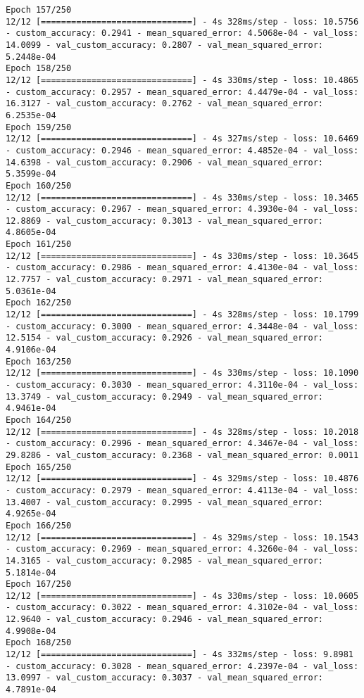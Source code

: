 \begin{lstlisting}
Epoch 157/250
12/12 [==============================] - 4s 328ms/step - loss: 10.5756 - custom_accuracy: 0.2941 - mean_squared_error: 4.5068e-04 - val_loss: 14.0099 - val_custom_accuracy: 0.2807 - val_mean_squared_error: 5.2448e-04
Epoch 158/250
12/12 [==============================] - 4s 330ms/step - loss: 10.4865 - custom_accuracy: 0.2957 - mean_squared_error: 4.4479e-04 - val_loss: 16.3127 - val_custom_accuracy: 0.2762 - val_mean_squared_error: 6.2535e-04
Epoch 159/250
12/12 [==============================] - 4s 327ms/step - loss: 10.6469 - custom_accuracy: 0.2946 - mean_squared_error: 4.4852e-04 - val_loss: 14.6398 - val_custom_accuracy: 0.2906 - val_mean_squared_error: 5.3599e-04
Epoch 160/250
12/12 [==============================] - 4s 330ms/step - loss: 10.3465 - custom_accuracy: 0.2967 - mean_squared_error: 4.3930e-04 - val_loss: 12.8869 - val_custom_accuracy: 0.3013 - val_mean_squared_error: 4.8605e-04
Epoch 161/250
12/12 [==============================] - 4s 330ms/step - loss: 10.3645 - custom_accuracy: 0.2986 - mean_squared_error: 4.4130e-04 - val_loss: 12.7757 - val_custom_accuracy: 0.2971 - val_mean_squared_error: 5.0361e-04
Epoch 162/250
12/12 [==============================] - 4s 328ms/step - loss: 10.1799 - custom_accuracy: 0.3000 - mean_squared_error: 4.3448e-04 - val_loss: 12.5154 - val_custom_accuracy: 0.2926 - val_mean_squared_error: 4.9106e-04
Epoch 163/250
12/12 [==============================] - 4s 330ms/step - loss: 10.1090 - custom_accuracy: 0.3030 - mean_squared_error: 4.3110e-04 - val_loss: 13.3749 - val_custom_accuracy: 0.2949 - val_mean_squared_error: 4.9461e-04
Epoch 164/250
12/12 [==============================] - 4s 328ms/step - loss: 10.2018 - custom_accuracy: 0.2996 - mean_squared_error: 4.3467e-04 - val_loss: 29.8286 - val_custom_accuracy: 0.2368 - val_mean_squared_error: 0.0011
Epoch 165/250
12/12 [==============================] - 4s 329ms/step - loss: 10.4876 - custom_accuracy: 0.2979 - mean_squared_error: 4.4113e-04 - val_loss: 13.4007 - val_custom_accuracy: 0.2995 - val_mean_squared_error: 4.9265e-04
Epoch 166/250
12/12 [==============================] - 4s 329ms/step - loss: 10.1543 - custom_accuracy: 0.2969 - mean_squared_error: 4.3260e-04 - val_loss: 14.3165 - val_custom_accuracy: 0.2985 - val_mean_squared_error: 5.1814e-04
Epoch 167/250
12/12 [==============================] - 4s 330ms/step - loss: 10.0605 - custom_accuracy: 0.3022 - mean_squared_error: 4.3102e-04 - val_loss: 12.9640 - val_custom_accuracy: 0.2946 - val_mean_squared_error: 4.9908e-04
Epoch 168/250
12/12 [==============================] - 4s 332ms/step - loss: 9.8981 - custom_accuracy: 0.3028 - mean_squared_error: 4.2397e-04 - val_loss: 13.0997 - val_custom_accuracy: 0.3037 - val_mean_squared_error: 4.7891e-04

\end{lstlisting}
